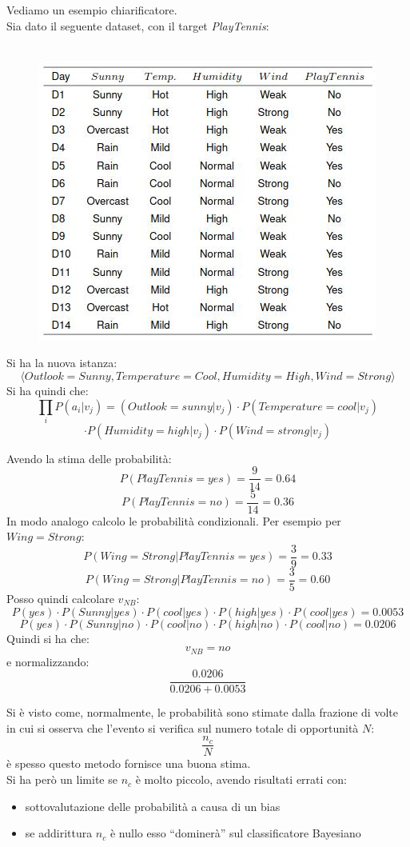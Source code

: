 \begin{esempio}
  Vediamo un esempio chiarificatore.\\
  Sia dato il seguente dataset, con il target \textit{PlayTennis}:
  \begin{figure}[H]
    \centering
\    \includegraphics[scale = 0.7]{img/cbn.jpg}
  \end{figure}
  Si ha la nuova istanza:
  \[\langle Outlook=Sunny, Temperature=Cool, Humidity=High,
      Wind=Strong \rangle\]
  Si ha quindi che:
  \[\prod_iP(a_i|v_j)=(Outlook=sunny|v_j)\cdot
      P(Temperature=cool|v_j)\]\[\cdot P(Humidity=high|v_j)\cdot
      P(Wind=strong|v_j)\]
 
  Avendo la stima delle probabilità:
  \[P(PlayTennis=yes)=\frac{9}{14}=0.64\]
  \[P(PlayTennis=no)=\frac{5}{14}=0.36\]
  In modo analogo calcolo le probabilità condizionali. Per esempio per
  $Wing=Strong$:
  \[P(Wing=Strong|PlayTennis=yes)=\frac{3}{9}=0.33\]
  \[P(Wing=Strong|PlayTennis=no)=\frac{3}{5}=0.60\]
  Posso quindi calcolare $v_{NB}$:
  \[P(yes)\cdot P(Sunny|yes)\cdot P(cool|yes)\cdot P(high|yes)\cdot
    P(cool|yes)=0.0053\]
  \[P(yes)\cdot P(Sunny|no)\cdot P(cool|no)\cdot P(high|no)\cdot
    P(cool|no)=0.0206\]
  Quindi si ha che:
  \[v_{NB}=no\]
  e normalizzando:
  \[\frac{0.0206}{0.0206+0.0053}\]
\end{esempio}
Si è visto come, normalmente, le probabilità sono stimate dalla frazione di
volte in cui si osserva che l'evento si verifica sul numero totale di
opportunità $N$:
\[\frac{n_c}{N}\]
è spesso questo metodo fornisce una buona stima.\\
Si ha però un limite se $n_c$ è molto piccolo, avendo risultati errati con:
\begin{itemize}
  \item sottovalutazione delle probabilità a causa di un bias
  \item se addirittura $n_c$ è nullo esso ``dominerà'' sul classificatore
  Bayesiano 
\end{itemize}
